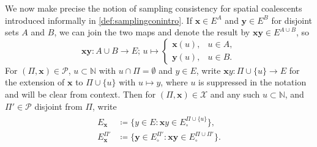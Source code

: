 \documentclass[reqno,draft]{amsart}
\numberwithin{equation}{section}
\theoremstyle{plain}
\theoremstyle{remark}
\newcommand{\N}{\mathbb{N}} %
\renewcommand{\P}{\mathbb{P}} %
\newcommand{\fpart}{\Pi} %
\begin{document}
%
We now make precise the notion of sampling consistency for spatial coalescents introduced informally in \cref{def:samplingconintro}.
If $\boldsymbol x\in E^A$ and $\boldsymbol y\in E^B$ for disjoint sets $A$ and $B$, we can join the two maps and denote the result by $\boldsymbol x\boldsymbol y\in E^{A\cup B}$, so
\begin{equation}\label{eq:joinmaps}
    \boldsymbol x \boldsymbol y \colon A \cup B \to E;\, u \mapsto
    \begin{cases}
        \boldsymbol x(u), & u \in A,\\
        \boldsymbol y(u), & u \in B.
    \end{cases}
\end{equation}
For $(\fpart,\boldsymbol x) \in \mathcal{P}$, $u\subset \N$ with $u \cap \fpart = \emptyset $ and $y\in E$, write $\boldsymbol x y \colon \fpart \cup \{u\} \to E$ for the extension of $\boldsymbol x$ to $\fpart \cup \{u\}$ with $u\mapsto y$, where $u$ is suppressed in the notation and will be clear from context. Then for $(\fpart,\boldsymbol x) \in \mathcal{X}$ and any such $u \subset \N$, and $\fpart'\in \mathcal{P}$ disjoint from $\fpart$, write
\begin{align}\begin{split}\label{eq:Ex}
    E_{\boldsymbol x} &\coloneqq \{ y\in E\colon \boldsymbol xy \in E^{\fpart \cup \{u\}}_\circ  \},\\
    E_{\boldsymbol x}^{\fpart'} &\coloneqq \{ \boldsymbol y \in E^{\fpart'}_\circ \colon \boldsymbol x\boldsymbol y \in E^{\fpart\cup\fpart'}_\circ \}.
\end{split}\end{align}
\end{document}
